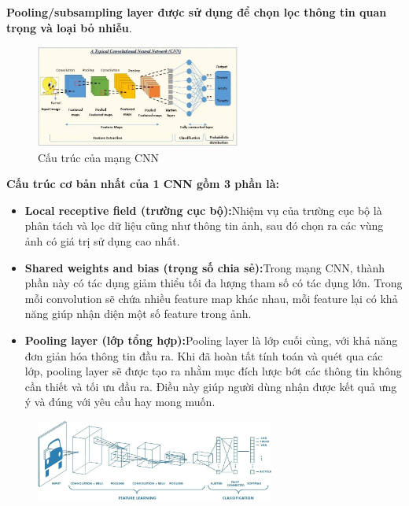 \noindent\textbf{ Pooling/subsampling layer được sử dụng để chọn lọc thông tin quan trọng và loại bỏ nhiễu}.
\begin{figure}[htbp]
        \centering
        \includegraphics[width=0.6\textwidth]{images/2a-sign/cnn.jpg}
        \newline
        \caption{Cấu trúc của mạng CNN}
\end{figure}
\textbf{Cấu trúc cơ bản nhất của 1 CNN gồm 3 phần là:}
\begin{itemize}
    \item \textbf{Local receptive field (trường cục bộ):}Nhiệm vụ của trường cục bộ là phân tách và lọc dữ liệu cũng như thông tin ảnh, sau đó chọn ra các vùng ảnh có giá trị sử dụng cao nhất. 
    \item \textbf{Shared weights and bias (trọng số chia sẻ):}Trong mạng CNN, thành phần này có tác dụng giảm thiểu tối đa lượng tham số có tác dụng lớn. Trong mỗi convolution sẽ chứa nhiều feature map khác nhau, mỗi feature lại có khả năng giúp nhận diện một số feature trong ảnh. 
    \item \textbf{Pooling layer (lớp tổng hợp):}Pooling layer là lớp cuối cùng, với khả năng đơn giản hóa thông tin đầu ra. Khi đã hoàn tất tính toán và quét qua các lớp, pooling layer sẽ được tạo ra nhằm mục đích lược bớt các thông tin không cần thiết và tối ưu đầu ra. Điều này giúp người dùng nhận được kết quả ưng ý và đúng với yêu cầu hay mong muốn.
\end{itemize}
\begin{figure}[htbp]
        \centering
        \includegraphics[width=0.7\textwidth]{images/2a-sign/cnn1.jpg}
        
\end{figure}

